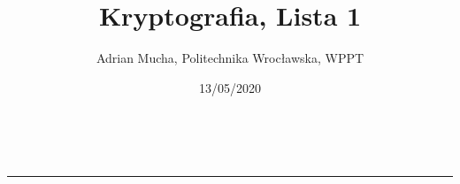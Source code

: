 \documentclass[a4paper,11pt]{article}
\makeatletter
\newcommand{\linia}{\rule{\linewidth}{0.5pt}}
\theoremstyle{mytheor}
\renewcommand{\maketitle}{
\begin{center}
\vspace{2ex}
{\huge \textsc{\@title}}
\vspace{1ex}
\\
\linia\\
\@author \hfill \@date
\vspace{4ex}
\end{center}
}
\makeatother
\begin{document}
\title{Kryptografia, Lista 1}

\author{Adrian Mucha, Politechnika Wrocławska, WPPT}

\date{13/05/2020}

\maketitle



\end{document}
